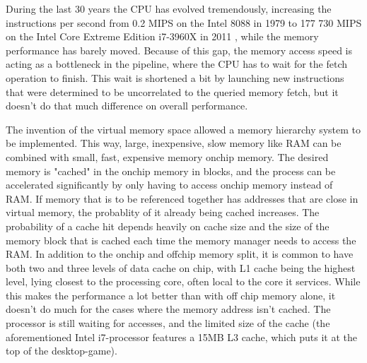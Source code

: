 During the last 30 years the CPU has evolved tremendously, increasing the instructions per second from 0.2 MIPS on the Intel 8088 in 1979\cite{reference:intel} to 177 730 MIPS on the Intel Core Extreme Edition i7-3960X in 2011 \cite{reference:inteli7}, while the memory performance has barely moved. Because of this gap, the memory access speed is acting as a bottleneck in the pipeline, where the CPU has to wait for the fetch operation to finish. This wait is shortened a bit by launching new instructions that were determined to be uncorrelated to the queried memory fetch, but it doesn't do that much difference on overall performance.

The invention of the virtual memory space allowed a memory hierarchy system to be implemented. This way, large, inexpensive, slow memory like RAM can be combined with small, fast, expensive memory onchip memory. The desired memory is "cached" in the onchip memory in blocks, and the process can be accelerated significantly by only having to access onchip memory instead of RAM. If memory that is to be referenced together has addresses that are close in virtual memory, the probablity of it already being cached increases. The probability of a cache hit depends heavily on cache size and the size of the memory block that is cached each time the memory manager needs to access the RAM. In addition to the onchip and offchip memory split, it is common to have both two and three levels of data cache on chip, with L1 cache being the highest level, lying closest to the processing core, often local to the core it services. While this makes the performance a lot better than with off chip memory alone, it doesn't do much for the cases where the memory address isn't cached. The processor is still waiting for accesses, and the limited size of the cache (the aforementioned Intel i7-processor features a 15MB L3 cache, which puts it at the top of the desktop-game). 

